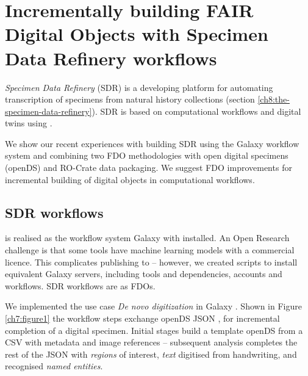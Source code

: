 \section[Incrementally building FAIR Digital Objects with the Specimen Data Refinery]{Incrementally building FAIR Digital Objects with Specimen Data Refinery workflows}
\label{ch7:incrementally-building-fair-digital-objects-with-specimen-data-refinery-workflows}

\emph{Specimen Data Refinery} (\acrshort{SDR}) is a developing platform for
automating transcription of specimens from natural history collections
\cite{Hardisty 2022} (section \vref{ch8:the-specimen-data-refinery}). SDR is
based on computational workflows and digital twins using
.

We show our recent experiences with building SDR using the Galaxy
workflow system and combining two FDO methodologies with open digital
specimens (\acrshort{openDS}) and RO-Crate data packaging. We suggest FDO
improvements for incremental building of digital objects in
computational workflows.

\subsection{SDR workflows}\label{ch7:sdr-workflows}

 is realised as the workflow system
Galaxy \cite{Afgan 2018} with
 installed. An Open
Research challenge is that some tools have machine learning models with
a commercial licence. This complicates publishing to
 -- however, we
created  scripts to install
equivalent Galaxy servers, including tools and dependencies, accounts
and workflows. SDR workflows are
 as
FDOs.

We implemented the use case \emph{De novo digitization} in Galaxy \cite{Brack 2022b}.
Shown in Figure \vref{ch7:figure1} the
workflow steps exchange openDS \acrshort{JSON} \cite{Hardisty 2019a}, for
incremental completion of a digital specimen. Initial stages build a
template openDS from a \acrshort{CSV} with metadata and image references --
subsequent analysis completes the rest of the JSON with \emph{regions}
of interest, \emph{text} digitised from handwriting, and recognised
\emph{named entities}.

